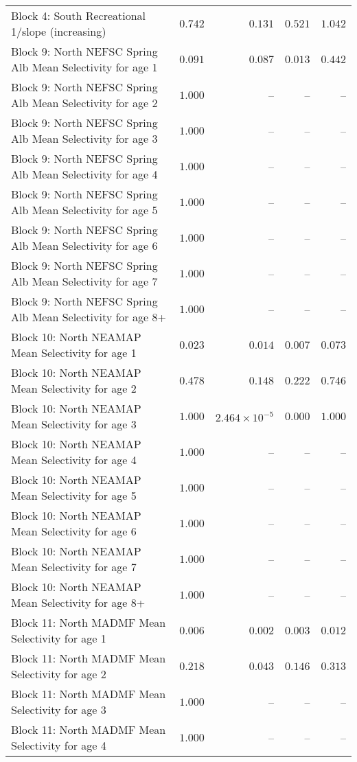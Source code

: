 \documentclass[
]{article}
\begin{document}
\begin{landscape}
\begin{longtable}[t]{lrrrr}
Block 4: South Recreational 1/slope (increasing) & $0.742$ & $0.131$ & $0.521$ & $1.042$\\
Block 9: North NEFSC Spring Alb Mean Selectivity for age 1 & $0.091$ & $0.087$ & $0.013$ & $0.442$\\
Block 9: North NEFSC Spring Alb Mean Selectivity for age 2 & $1.000$ & -- & -- & --\\
Block 9: North NEFSC Spring Alb Mean Selectivity for age 3 & $1.000$ & -- & -- & --\\
\addlinespace
Block 9: North NEFSC Spring Alb Mean Selectivity for age 4 & $1.000$ & -- & -- & --\\
Block 9: North NEFSC Spring Alb Mean Selectivity for age 5 & $1.000$ & -- & -- & --\\
Block 9: North NEFSC Spring Alb Mean Selectivity for age 6 & $1.000$ & -- & -- & --\\
Block 9: North NEFSC Spring Alb Mean Selectivity for age 7 & $1.000$ & -- & -- & --\\
Block 9: North NEFSC Spring Alb Mean Selectivity for age 8+ & $1.000$ & -- & -- & --\\
\addlinespace
Block 10: North NEAMAP Mean Selectivity for age 1 & $0.023$ & $0.014$ & $0.007$ & $0.073$\\
Block 10: North NEAMAP Mean Selectivity for age 2 & $0.478$ & $0.148$ & $0.222$ & $0.746$\\
Block 10: North NEAMAP Mean Selectivity for age 3 & $1.000$ & $2.464\times 10^{-5}$ & $0.000$ & $1.000$\\
Block 10: North NEAMAP Mean Selectivity for age 4 & $1.000$ & -- & -- & --\\
Block 10: North NEAMAP Mean Selectivity for age 5 & $1.000$ & -- & -- & --\\
\addlinespace
Block 10: North NEAMAP Mean Selectivity for age 6 & $1.000$ & -- & -- & --\\
Block 10: North NEAMAP Mean Selectivity for age 7 & $1.000$ & -- & -- & --\\
Block 10: North NEAMAP Mean Selectivity for age 8+ & $1.000$ & -- & -- & --\\
Block 11: North MADMF Mean Selectivity for age 1 & $0.006$ & $0.002$ & $0.003$ & $0.012$\\
Block 11: North MADMF Mean Selectivity for age 2 & $0.218$ & $0.043$ & $0.146$ & $0.313$\\
\addlinespace
Block 11: North MADMF Mean Selectivity for age 3 & $1.000$ & -- & -- & --\\
Block 11: North MADMF Mean Selectivity for age 4 & $1.000$ & -- & -- & --\\

\end{longtable}
\end{landscape}
\end{document}
